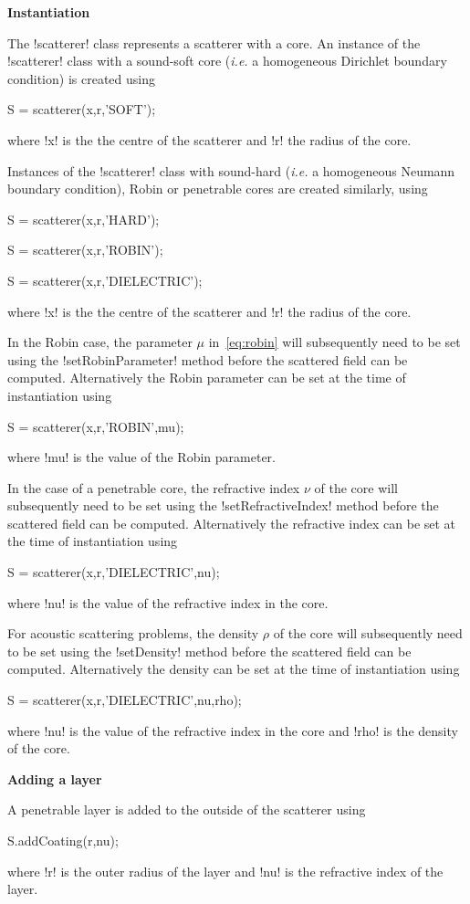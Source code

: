 \documentclass[11pt,letterpaper]{article}
\newcommand{\ie}{{\em i.e.}}
\newcommand{\techheading}[1]{%
    \par\vspace{-0.3\parskip}\noindent\hspace{-1cm}\textbf{#1}%
    \par\vspace{-0.5\parskip}\noindent\nopagebreak\ignorespaces}
\begin{document}
\techheading{Instantiation}
The !scatterer! class represents a scatterer
with a core.
An instance of the !scatterer! class with a sound-soft core
(\ie{} a homogeneous Dirichlet boundary condition)
is created using
\begin{matlab}
S = scatterer(x,r,'SOFT');
\end{matlab}
where !x! is the the centre of the scatterer and !r! the radius of the core.

Instances of the !scatterer! class with
sound-hard (\ie{} a homogeneous Neumann boundary condition),
Robin 
or penetrable cores are created similarly, using
\begin{matlab}
S = scatterer(x,r,'HARD');

S = scatterer(x,r,'ROBIN');

S = scatterer(x,r,'DIELECTRIC');
\end{matlab}
where !x! is the the centre of the scatterer and !r! the radius of the core.

In the Robin case, the parameter $\mu$ in~\eqref{eq:robin} will subsequently
need to be set using the !setRobinParameter! method before the scattered
field can be computed.
Alternatively the Robin parameter can be set at the time of instantiation 
using
\begin{matlab}
S = scatterer(x,r,'ROBIN',mu);
\end{matlab}
where !mu! is the value of the Robin parameter.

In the case of a penetrable core, the 
refractive index $\nu$ of the core will subsequently
need to be set using the !setRefractiveIndex! method before the scattered
field can be computed.
Alternatively the refractive index can be set at the time of instantiation 
using
\begin{matlab}
S = scatterer(x,r,'DIELECTRIC',nu);
\end{matlab}
where !nu! is the value of the refractive index in the core.

For acoustic scattering problems,
the density $\rho$ of the core will subsequently
need to be set using the !setDensity! method before the scattered
field can be computed.
Alternatively the density can be set at the time of instantiation 
using
\begin{matlab}
S = scatterer(x,r,'DIELECTRIC',nu,rho);
\end{matlab}
where !nu! is the value of the refractive index in the core
and !rho! is the density of the core.


\techheading{Adding a layer}
A penetrable layer is added to the outside of the scatterer using
\begin{matlab}
S.addCoating(r,nu);
\end{matlab}
where !r! is the outer radius of the layer and !nu! is the refractive
index of the layer.
\end{document}
